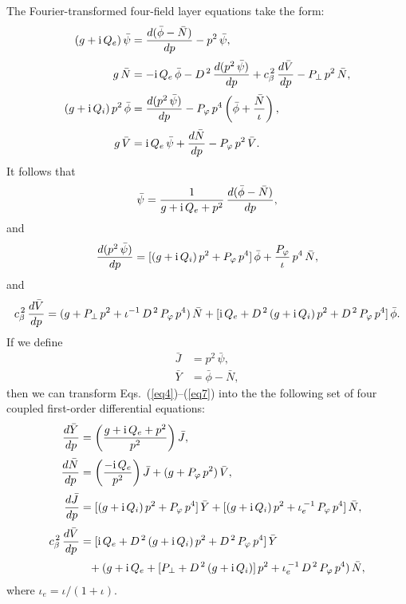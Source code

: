 \documentclass[12pt,prb,aps,notitlepage]{revtex4-1}
\begin{document}
The  Fourier-transformed four-field layer equations take the form:
\begin{align}
(g+{\rm i}\,Q_e)\,\bar{\psi} &= \frac{d(\bar{\phi}-\bar{N})}{dp} - p^2\,\bar{\psi},\\[0.5ex]
g\,\bar{N} &= -{\rm i}\,Q_e\,\bar{\phi} - D^{\,2}\,\frac{d(p^2\,\bar{\psi})}{dp} + c_\beta^{\,2}\,\frac{d\bar{V}}{dp} - P_\perp\,p^2\,\bar{N},\\[0.5ex]
(g+ {\rm i}\,Q_i)\,p^2\,\bar{\phi} &= \frac{d(p^2\,\bar{\psi})}{dp} - P_\varphi\,p^4\left(\bar{\phi}+ \frac{\bar{N}}{\iota}\right),\\[0.5ex]
g\,\bar{V} &= {\rm i}\,Q_e\,\bar{\psi} + \frac{d\bar{N}}{dp} - P_\varphi\,p^2\,\bar{V}.\label{eq4}
\end{align}
It follows that
\begin{equation}
\bar{\psi} = \frac{1}{g+{\rm i}\,Q_e+p^2}\,\frac{d(\bar{\phi}-\bar{N})}{dp},
\end{equation}
and
\begin{equation}
\frac{d(p^2\,\bar{\psi})}{dp} = [(g+{\rm i}\,Q_i)\,p^2 + P_\varphi\,p^4]\,\bar{\phi} + \frac{P_\varphi}{\iota}\,p^4\,\bar{N},
\end{equation}
and
\begin{equation}
c_\beta^{\,2}\,\frac{d\bar{V}}{dp} = (g + P_\perp\,p^2+ \iota^{-1}\,D^{\,2}\,P_\varphi\,p^4)\,\bar{N}+ [
{\rm i}\,Q_e + D^{\,2}\,(g+{\rm i}\,Q_i)\,p^2 + D^{\,2}\,P_\varphi\,p^4]\,\bar{\phi}.\label{eq7}
\end{equation}
If we define 
\begin{align}
\bar{J}&= p^2\,\bar{\psi},\\[0.5ex]
\bar{Y} &= \bar{\phi}-\bar{N},
\end{align}
then we can transform Eqs.~(\ref{eq4})--(\ref{eq7}) into the  the following set of four coupled first-order differential equations:
\begin{align}\label{e1}
\frac{d\bar{Y}}{dp} &= \left(\frac{g+{\rm i}\,Q_e+p^2}{p^2}\right)\bar{J},\\[0.5ex]
\frac{d\bar{N}}{dp} &= \left(\frac{-{\rm i}\,Q_e}{p^2}\right)\bar{J} + (g + P_\varphi\,p^2)\,\bar{V},\\[0.5ex]
\frac{d\bar{J}}{dp} &= [(g+{\rm i}\,Q_i)\,p^2 + P_\varphi\,p^4]\,\bar{Y}
+ [(g+{\rm i}\,Q_i)\,p^2 + \iota_e^{\,-1}\,P_\varphi\,p^4]\,\bar{N},\\[0.5ex]
c_\beta^{\,2}\,\frac{d\bar{V}}{dp} &= [{\rm i}\,Q_e+ D^{\,2}\,(g+{\rm i}\,Q_i)\,p^2 + D^{\,2}\,P_\varphi\,p^4]\,\bar{Y}
\nonumber\\[0.5ex]&\phantom{=} +(g+{\rm i}\,Q_e + [P_\perp+ D^{\,2}\,(g + {\rm i}\,Q_i)]\,p^2 + \iota_e^{\,-1}\,D^{\,2}\,P_\varphi\,p^4)\,\bar{N},\label{e4}
\end{align}
where $\iota_e=\iota/(1+\iota)$. 
\end{document}
